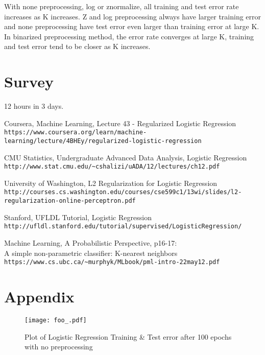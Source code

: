 \documentclass[11pt, oneside]{article}
\begin{document}
With none preprocessing, log or znormalize, all training and test error rate increases as K increases. Z and log preprocessing always have larger training error and none preprocessing have test error even larger than training error at large K. In binarized preprocessing method, the error rate converges at large K, training and test error tend to be closer as K increases.

\newpage
\section{Survey}
12 hours in 3 days.

\begin{thebibliography}{9}
Coursera, Machine Learning, Lecture 43 - Regularized Logistic Regression
\\\texttt{https://www.coursera.org/learn/machine-learning/lecture/4BHEy/regularized-logistic-regression}

CMU Statistics, Undergraduate Advanced Data Analysis, Logistic Regression
\\\texttt{http://www.stat.cmu.edu/\~{}cshalizi/uADA/12/lectures/ch12.pdf}

University of Washington, L2 Regularization for Logistic Regression
\\\texttt{http://courses.cs.washington.edu/courses/cse599c1/13wi/slides/l2-regularization-online-perceptron.pdf}

Stanford, UFLDL Tutorial, Logistic Regression
\\\texttt{http://ufldl.stanford.edu/tutorial/supervised/LogisticRegression/}

Machine Learning, A Probabilistic Perspective, p16-17:\\A simple non-parametric classifier: K-nearest neighbors
\\\texttt{https://www.cs.ubc.ca/\~{}murphyk/MLbook/pml-intro-22may12.pdf}
\end{thebibliography}

\newpage
\section{Appendix}

\begin{figure}[h]
\centering
\texttt{[image: foo\_.pdf]}
\caption{Plot of Logistic Regression Training \& Test error after 100 epochs with no preprocessing}
\end{figure}
\end{document}
